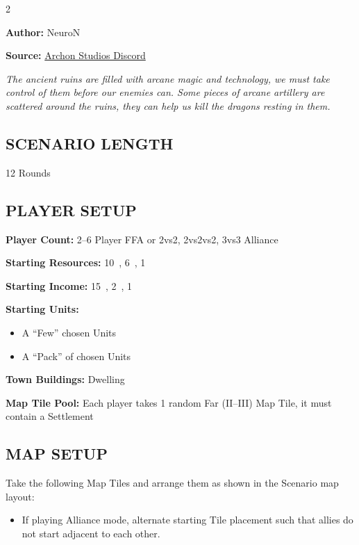 
\begin{multicols}{2}

\textbf{Author:} NeuroN

\textbf{Source:} \href{https://discord.com/channels/740870068178649108/1279029213839626313}{Archon Studios Discord}

\textit{The ancient ruins are filled with arcane magic and technology, we must take control of them before our enemies can.
Some pieces of arcane artillery are scattered around the ruins, they can help us kill the dragons resting in them.}

\subsection*{\MakeUppercase{Scenario Length}}
12 Rounds

\subsection*{\MakeUppercase{Player Setup}}
\textbf{Player Count:} 2--6 Player FFA or 2vs2, 2vs2vs2, 3vs3 Alliance

\textbf{Starting Resources:} 10~, 6~, 1~

\textbf{Starting Income:} 15~, 2~, 1~

\textbf{Starting Units:}
\begin{itemize}
  \item A ``Few'' chosen  Units
  \item A ``Pack'' of chosen  Units
\end{itemize}

\textbf{Town Buildings:}  Dwelling

\textbf{Map Tile Pool:} Each player takes 1 random Far (II--III) Map Tile, it must contain a Settlement

\subsection*{\MakeUppercase{Map Setup}}
Take the following Map Tiles and arrange them as shown in the Scenario map layout:

\begin{itemize}
  \item If playing Alliance mode, alternate starting Tile placement such that allies do not start adjacent to each other.
\end{itemize}


\end{multicols}
